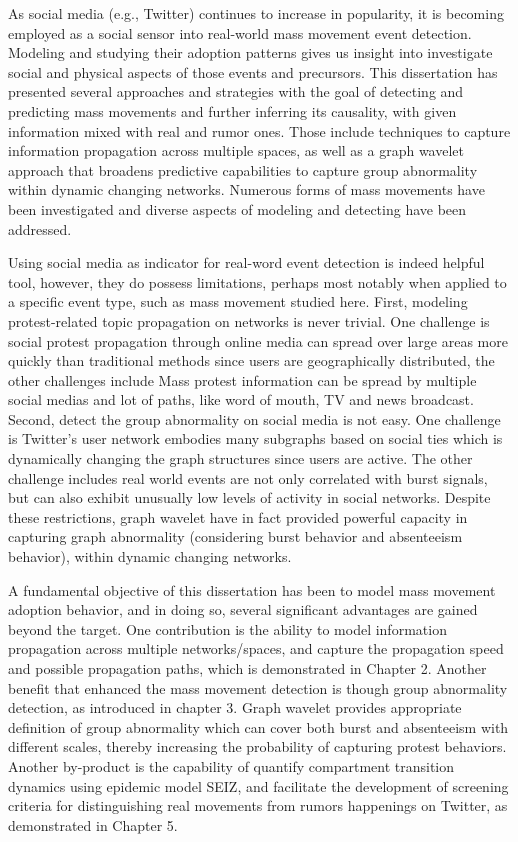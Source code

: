 As social media (e.g., Twitter) continues to increase in popularity, it is becoming employed
as a social sensor into real-world mass movement event detection. Modeling and studying their adoption patterns gives us insight into investigate social and physical aspects of those events and precursors. This dissertation has presented several approaches and strategies with the goal of detecting and predicting mass movements and further inferring its causality, with given information mixed with real and rumor ones. Those include techniques to capture information propagation across multiple spaces, as well as a graph wavelet approach that broadens predictive capabilities to capture group abnormality within dynamic changing networks. Numerous forms of mass movements have been investigated and diverse aspects of modeling and detecting have been addressed. 

Using social media as indicator for real-word event detection is indeed helpful tool, however, they do possess limitations, perhaps most notably when applied to a specific event type, such as mass movement studied here. First, modeling protest-related topic propagation on networks is never trivial. One challenge is social protest propagation through online media can spread over large areas more quickly than traditional methods since users are geographically distributed, the other challenges include Mass protest information can be spread by multiple social medias and lot of paths, like word of mouth, TV and news broadcast. Second, detect the group abnormality on social media is not easy. One challenge is Twitter's user network embodies many subgraphs based on social ties which is dynamically changing the graph structures since users are active. The other challenge includes real world events are not only correlated with burst signals, but can also exhibit unusually low levels of activity in social networks. 
Despite these restrictions, graph wavelet have in fact provided powerful capacity in capturing graph abnormality (considering burst behavior and absenteeism behavior), within dynamic changing networks.


A fundamental objective of this dissertation has been to model mass movement adoption behavior, and in doing so, several significant advantages are gained beyond the target. One contribution is the ability to model information propagation across multiple networks/spaces, and capture the propagation speed and possible propagation paths, which is demonstrated in Chapter 2. Another benefit that enhanced the mass movement detection is though group abnormality detection, as introduced in chapter 3. Graph wavelet provides appropriate definition of group abnormality which can cover both burst and absenteeism with different scales, thereby increasing the probability of capturing protest behaviors. Another by-product is the capability of quantify compartment transition dynamics using epidemic model SEIZ, and facilitate the development of screening criteria for distinguishing real movements from rumors happenings on Twitter, as demonstrated in Chapter 5.


